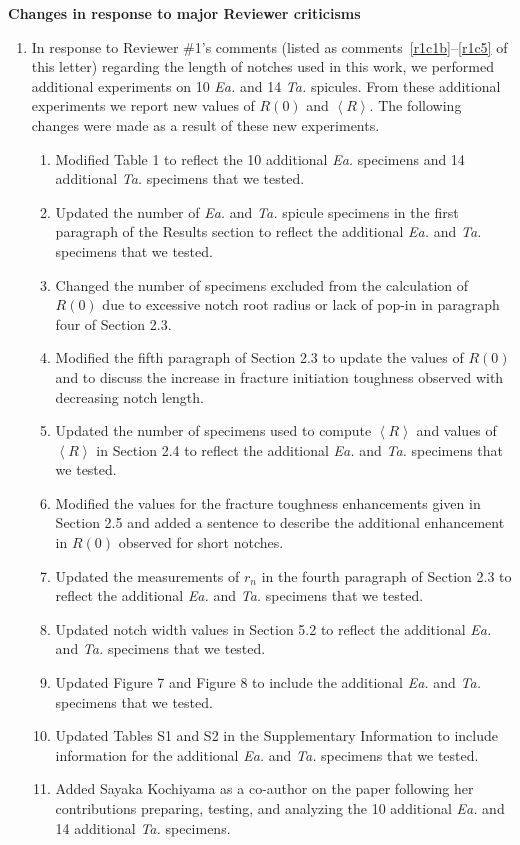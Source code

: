 \documentclass[11pt,letterpaper]{report}
\makeatletter
\newcommand{\TA}{\textit{Ta.\@}\xspace}
\newcommand{\EA}{\textit{Ea.\@}\xspace}
\makeatother
\begin{document}
{\bf Changes in response to major Reviewer criticisms}
\begin{enumerate}[label=\textit{Mc.\arabic*}]
%

\item \label{Mc03} In response to Reviewer \#1's comments (listed as comments~\ref{r1c1b}--\ref{r1c5} of this letter) regarding the length of notches used in this work, we performed additional experiments on 10 \EA and 14 \TA spicules. From these additional experiments we report new values of $R(0)$ and $\left< R \right>$. The following changes were made as a result of these new experiments.
%
\begin{enumerate}[label=\textit{\ref{Mc03}.\roman*}]
    \item \label{mc01} Modified Table 1 to reflect the 10 additional \EA specimens and 14 additional \TA specimens that we tested.
    \item \label{mc02} Updated the number of \EA and \TA spicule specimens in the first paragraph of the Results section to reflect the additional \EA and \TA specimens that we tested.
    \item \label{mc04} Changed the number of specimens excluded from the calculation of $R(0)$ due to excessive notch root radius or lack of pop-in in paragraph four of Section 2.3.
    \item \label{mc05} Modified the fifth paragraph of Section 2.3 to update the values of $R(0)$ and to discuss the increase in fracture initiation toughness observed with decreasing notch length.
    \item \label{mc06} Updated the number of specimens used to compute $\left< R \right>$ and values of $\left< R \right>$ in Section 2.4 to reflect the additional \EA and \TA specimens that we tested.
    \item \label{mc07} Modified the values for the fracture toughness enhancements given in Section 2.5 and added a sentence to describe the additional enhancement in $R(0)$ observed for short notches.
    \item \label{mc03} Updated the measurements of $r_n$ in the fourth paragraph of Section 2.3 to reflect the additional \EA and \TA specimens that we tested.
    \item \label{mc09} Updated notch width values in Section 5.2 to reflect the additional \EA and \TA specimens that we tested.
    \item \label{mc010} Updated Figure 7 and Figure 8 to include the additional \EA and \TA specimens that we tested.
    \item \label{mc011} Updated Tables S1 and S2 in the Supplementary Information to include information for the additional \EA and \TA specimens that we tested.
    \item \label{mc00} Added Sayaka Kochiyama as a co-author on the paper following her contributions preparing, testing, and analyzing the 10 additional \EA and 14 additional \TA specimens. 
\end{enumerate}


\end{enumerate}
\end{document}

